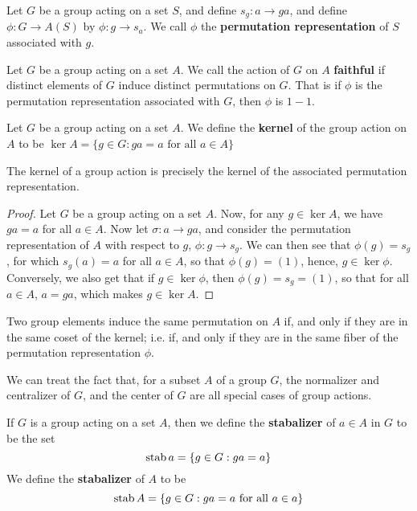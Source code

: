 \begin{definition}
  Let $G$ be a group acting on a set  $S$, and define $s_g:a \rightarrow
  ga$, and define $\phi:G \rightarrow A(S)$ by $\phi:g \rightarrow s_a$.
  We call $\phi$ the  \textbf{permutation representation} of $S$ associated
  with  $g$.
\end{definition}

\begin{definition}
  Let $G$ be a group acting on a set $A$. We call the action of $G$ on  $A$
  \textbf{faithful} if distinct elements of $G$ induce distinct permutations
  on  $G$. That is if $\phi$ is the permutation representation associated
  with  $G$, then  $\phi$ is  $1-1$.
\end{definition}

\begin{definition}
  Let $G$ be a group acting on a set $A$. We define the \textbf{kernel} of the
  group action on $A$ to be  $\ker{A}=\{g \in G : ga=a \text{ for all } a \in
  A\}$
\end{definition}

\begin{proposition}\label{proposition_4.1.2}
  The kernel of a group action is precisely the kernel of the associated
  permutation representation.
\end{proposition}
\begin{proof}
  Let $G$ be a group acting on a set  $A$. Now, for any  $g \in \ker{A}$, we
  have $ga=a$ for all  $a \in A$. Now let $\sigma:a \rightarrow ga$, and
  consider the permutation representation of $A$ with respect to  $g$,
  $\phi:g \rightarrow s_g$. We can then see that $\phi(g)=s_g$,
  for which $s_g(a)=a$ for all $a \in A$, so that  $\phi(g)=(1)$, hence,
  $g \in \ker{\phi}$. Conversely, we also get that if $g \in \ker{\phi}$, then
  $\phi(g)=s_g=(1)$, so that for all $a \in A$, $a=ga$, which makes  $g
  \in \ker{A}$.
\end{proof}
\begin{corollary}
  Two group elements induce the same permutation on $A$ if, and only if they
  are in the same coset of the kernel; i.e. if, and only if they are in the
  same fiber of the permutation representation $\phi$.
\end{corollary}


We can treat the fact that, for a subset $A$ of a group  $G$, the normalizer and
centralizer of  $G$, and the center of  $G$ are all special cases of group
actions.

\begin{definition}
  If $G$ is a group acting on a set  $A$, then we define the
  \textbf{stabalizer} of $a \in A$ in $G$ to be the set
  \begin{equation*}
    \operatorname{stab}{a}=\{g \in G : ga=a\}
  \end{equation*}
  We define the \textbf{stabalizer} of $A$ to be
  \begin{equation*}
    \operatorname{stab}{A}=\{g \in G : ga=a \text{ for all } a \in a\}
  \end{equation*}
\end{definition}

